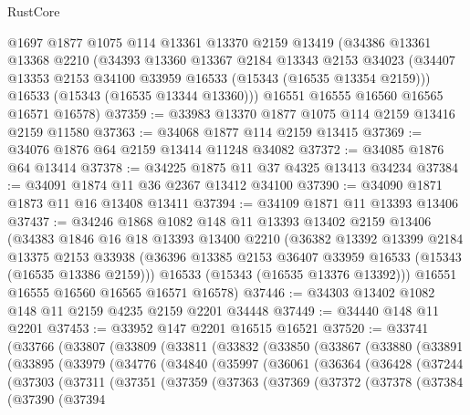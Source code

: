 \begin{lexlean}{RustCore}
\begin{coremodule}
    @1697
    @1877
    @1075
    @114
    @13361
    @13370
    @2159
    @13419
    (@34386
      @13361
      @13368
      @2210
      (@34393
        @13360
        @13367
        @2184
        @13343
        @2153
        @34023
        (@34407 @13353 @2153 @34100 @33959 @16533 (@15343 (@16535 @13354 @2159)))
        @16533
        (@15343 (@16535 @13344 @13360)))
      @16551
      @16555
      @16560
      @16565
      @16571
      @16578)
@37359 := @33983 @13370 @1877 @1075 @114 @2159 @13416 @2159 @11580
@37363 := @34068 @1877 @114 @2159 @13415
@37369 := @34076 @1876 @64 @2159 @13414 @11248 @34082
@37372 := @34085 @1876 @64 @13414
@37378 := @34225 @1875 @11 @37 @4325 @13413 @34234
@37384 := @34091 @1874 @11 @36 @2367 @13412 @34100
@37390 := @34090 @1871 @1873 @11 @16 @13408 @13411
@37394 := @34109 @1871 @11 @13393 @13406
@37437 := @34246
    @1868
    @1082
    @148
    @11
    @13393
    @13402
    @2159
    @13406
    (@34383
      @1846
      @16
      @18
      @13393
      @13400
      @2210
      (@36382
        @13392
        @13399
        @2184
        @13375
        @2153
        @33938
        (@36396 @13385 @2153 @36407 @33959 @16533 (@15343 (@16535 @13386 @2159)))
        @16533
        (@15343 (@16535 @13376 @13392)))
      @16551
      @16555
      @16560
      @16565
      @16571
      @16578)
@37446 := @34303 @13402 @1082 @148 @11 @2159 @4235 @2159 @2201 @34448
@37449 := @34440 @148 @11 @2201
@37453 := @33952 @147 @2201 @16515 @16521
@37520 := @33741
    (@33766
      (@33807
        (@33809
          (@33811
            (@33832
              (@33850
                (@33867
                  (@33880
                    (@33891
                      (@33895
                        (@33979
                          (@34776
                            (@34840
                              (@35997
                                (@36061
                                  (@36364
                                    (@36428
                                      (@37244
                                        (@37303
                                          (@37311
                                            (@37351
                                              (@37359
                                                (@37363
                                                  (@37369
                                                    (@37372
                                                      (@37378
                                                        (@37384
                                                          (@37390
                                                            (@37394

\end{coremodule}
\end{lexlean}
